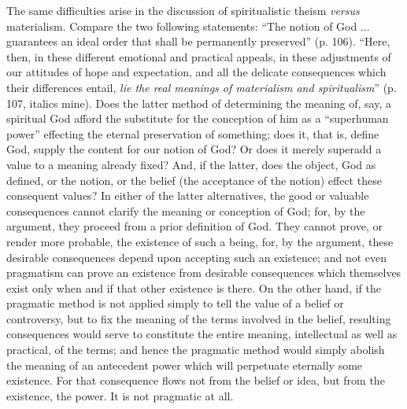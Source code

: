 \documentclass[12pt]{article}
\begin{document}
The same difficulties arise in the discussion of spiritualistic theism
\emph{versus} materialism. Compare the two following statements: ``The
notion of God ... guarantees an ideal order that shall be permanently
preserved'' (p. 106). ``Here, then, in these different emotional and
practical appeals, in these adjustments of our attitudes of hope and
expectation, and all the delicate consequences which their differences
entail, \emph{lie the real meanings of materialism and spiritualism}'' (p.
107, italics mine). Does the latter method of determining the meaning
of, say, a spiritual God afford the substitute for the conception of
him as a ``superhuman power'' effecting the eternal preservation of
something; does it, that is, define God, supply the content for our
notion of God? Or does it merely superadd a value to a meaning already
fixed? And, if the latter, does the object, God as defined, or the
notion, or the belief (the acceptance of the notion) effect these
consequent values? In either of the latter alternatives, the good or
valuable consequences cannot clarify the meaning or conception of God;
for, by the argument, they proceed from a prior definition of God.
They cannot prove, or render more probable, the existence of such a
being, for, by the argument, these desirable consequences depend upon
accepting such an existence; and not even pragmatism can prove an
existence from desirable consequences which themselves exist only when
and if that other existence is there. On the other hand, if the
pragmatic method is not applied simply to tell the value of a belief
or controversy, but to fix the meaning of the terms involved in the
belief, resulting consequences would serve to constitute the entire
meaning, intellectual as well as practical, of the terms; and hence
the pragmatic method would simply abolish the meaning of an antecedent
power which will perpetuate eternally some existence. For that
consequence flows not from the belief or idea, but from the existence,
the power. It is not pragmatic at all.
\end{document}
